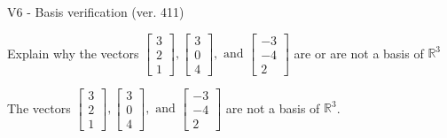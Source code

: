 \begin{exercise}
  \begin{exerciseTitle}V6 - Basis verification (ver. 411)\end{exerciseTitle}
  \begin{exerciseStatement}
    Explain why the vectors \(\left[\begin{array}{r}
3 \\
2 \\
1
\end{array}\right] , \left[\begin{array}{r}
3 \\
0 \\
4
\end{array}\right] , \text{ and } \left[\begin{array}{r}
-3 \\
-4 \\
2
\end{array}\right]\) are or are not a basis of \(\mathbb{R}^3\)	


  \end{exerciseStatement}
  \begin{exerciseAnswer}
   The vectors \(\left[\begin{array}{r}
3 \\
2 \\
1
\end{array}\right] , \left[\begin{array}{r}
3 \\
0 \\
4
\end{array}\right] , \text{ and } \left[\begin{array}{r}
-3 \\
-4 \\
2
\end{array}\right]\) 
  	 are not  a basis of \(\mathbb{R}^3\).
  


  \end{exerciseAnswer}
\end{exercise}